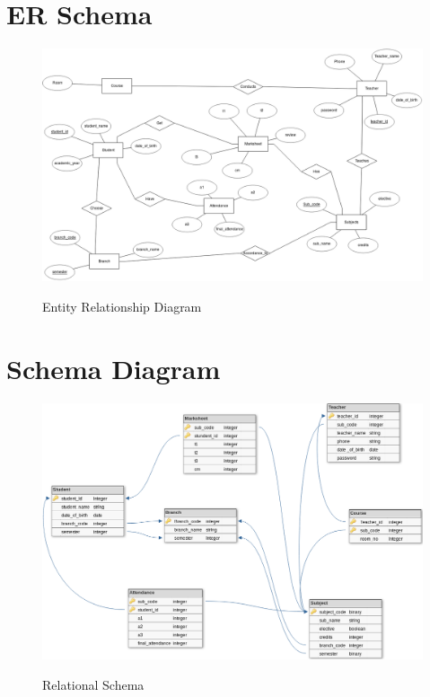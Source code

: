 \thispagestyle{fancy}

\section{ER Schema}
\begin{figure}[H]
\centering
\caption{Entity Relationship Diagram}
\includegraphics[width=\textwidth,height=\textheight,keepaspectratio]{./erd.png}
\\[0.2in]
\label{fig:Entitiy Relationship Diagram}
\end{figure}

\pagebreak
\thispagestyle{fancy}

\section{Schema Diagram}
\begin{figure}[H]
\centering
\caption{Relational Schema}
\includegraphics[scale=.5]{./schema.png}
\\[0.2in]
\label{fig:Relational Schema}
\end{figure}

\thispagestyle{fancy}